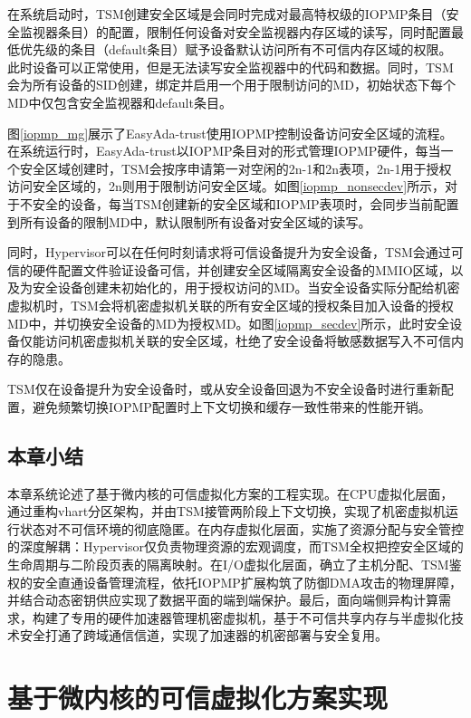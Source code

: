 \documentclass[master, vlined, review]{DissertUESTC}
\begin{document}
	在系统启动时，TSM创建安全区域是会同时完成对最高特权级的IOPMP条目（安全监视器条目）的配置，限制任何设备对安全监视器内存区域的读写，同时配置最低优先级的条目（default条目）赋予设备默认访问所有不可信内存区域的权限。此时设备可以正常使用，但是无法读写安全监视器中的代码和数据。同时，TSM会为所有设备的SID创建，绑定并启用一个用于限制访问的MD，初始状态下每个MD中仅包含安全监视器和default条目。
	
	图\ref{iopmp_mg}展示了EasyAda-trust使用IOPMP控制设备访问安全区域的流程。在系统运行时，EasyAda-trust以IOPMP条目对的形式管理IOPMP硬件，每当一个安全区域创建时，TSM会按序申请第一对空闲的2n-1和2n表项，2n-1用于授权访问安全区域的，2n则用于限制访问安全区域。如图\ref{iopmp_nonsecdev}所示，对于不安全的设备，每当TSM创建新的安全区域和IOPMP表项时，会同步当前配置到所有设备的限制MD中，默认限制所有设备对安全区域的读写。
	
	同时，Hypervisor可以在任何时刻请求将可信设备提升为安全设备，TSM会通过可信的硬件配置文件验证设备可信，并创建安全区域隔离安全设备的MMIO区域，以及为安全设备创建未初始化的，用于授权访问的MD。当安全设备实际分配给机密虚拟机时，TSM会将机密虚拟机关联的所有安全区域的授权条目加入设备的授权MD中，并切换安全设备的MD为授权MD。如图\ref{iopmp_secdev}所示，此时安全设备仅能访问机密虚拟机关联的安全区域，杜绝了安全设备将敏感数据写入不可信内存的隐患。
	
	TSM仅在设备提升为安全设备时，或从安全设备回退为不安全设备时进行重新配置，避免频繁切换IOPMP配置时上下文切换和缓存一致性带来的性能开销。
	
	\section{本章小结}        
	本章系统论述了基于微内核的可信虚拟化方案的工程实现。在CPU虚拟化层面，通过重构vhart分区架构，并由TSM接管两阶段上下文切换，实现了机密虚拟机运行状态对不可信环境的彻底隐匿。在内存虚拟化层面，实施了资源分配与安全管控的深度解耦：Hypervisor仅负责物理资源的宏观调度，而TSM全权把控安全区域的生命周期与二阶段页表的隔离映射。在I/O虚拟化层面，确立了主机分配、TSM鉴权的安全直通设备管理流程，依托IOPMP扩展构筑了防御DMA攻击的物理屏障，并结合动态密钥供应实现了数据平面的端到端保护。最后，面向端侧异构计算需求，构建了专用的硬件加速器管理机密虚拟机，基于不可信共享内存与半虚拟化技术安全打通了跨域通信信道，实现了加速器的机密部署与安全复用。
	
	\chapter{基于微内核的可信虚拟化方案实现}
	
\end{document}
